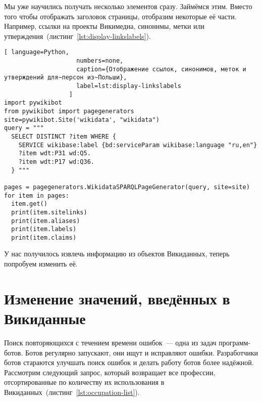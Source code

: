 Мы уже научились получать несколько элементов сразу. Займёмся этим. 
Вместо того чтобы отображать заголовок страницы, отобразим некоторые её части. 
Например, ссылки на проекты Викимедиа, синонимы, метки или утверждения~(листинг~\ref{lst:display-linkslabels}).



\newpage
{}
\begin{lstlisting}[ language=Python,
                    numbers=none,
                    caption={Отображение ссылок, синонимов, меток и утверждений для~персон из~Польши},
                    label=lst:display-linkslabels
                  ]
import pywikibot
from pywikibot import pagegenerators
site=pywikibot.Site('wikidata', "wikidata")
query = """
  SELECT DISTINCT ?item WHERE {
    SERVICE wikibase:label {bd:serviceParam wikibase:language "ru,en"}
    ?item wdt:P31 wd:Q5.
    ?item wdt:P17 wd:Q36.
  } """

pages = pagegenerators.WikidataSPARQLPageGenerator(query, site=site)
for item in pages:
  item.get()
  print(item.sitelinks)
  print(item.aliases)
  print(item.labels)
  print(item.claims)
\end{lstlisting} 


У нас получилось извлечь информацию из объектов Викиданных, теперь попробуем изменить её. 




\section{Изменение значений, введённых в Викиданные}
\label{sec:modifying the values entered in Wikidata}

Поиск повторяющихся с течением времени ошибок~--- одна из задач программ-ботов. 
Ботов регулярно запускают, они ищут и исправляют ошибки. 
Разработчики ботов стараются улучшать поиск ошибок и делать работу ботов более надёжной. 
Рассмотрим следующий запрос, который возвращает все профессии, 
отсортированные по количеству их использования в Викиданных~(листинг~\ref{lst:occupation-list}).



